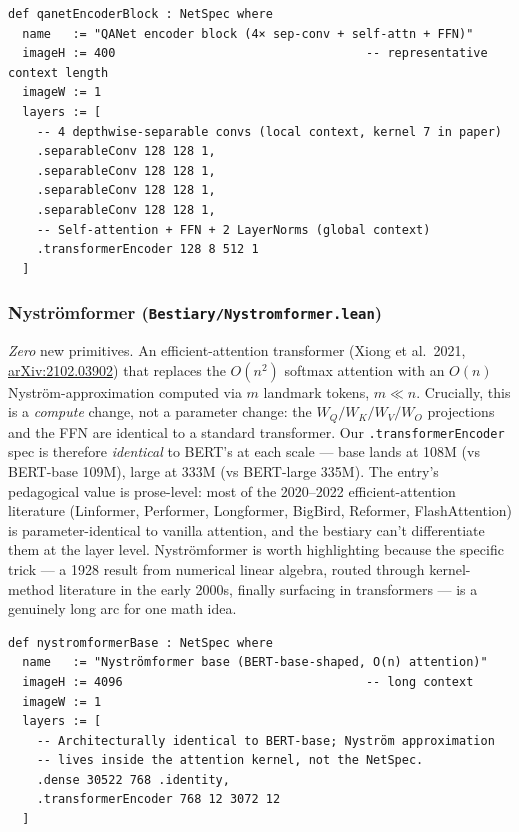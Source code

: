 \begin{verbatim}
def qanetEncoderBlock : NetSpec where
  name   := "QANet encoder block (4× sep-conv + self-attn + FFN)"
  imageH := 400                                   -- representative context length
  imageW := 1
  layers := [
    -- 4 depthwise-separable convs (local context, kernel 7 in paper)
    .separableConv 128 128 1,
    .separableConv 128 128 1,
    .separableConv 128 128 1,
    .separableConv 128 128 1,
    -- Self-attention + FFN + 2 LayerNorms (global context)
    .transformerEncoder 128 8 512 1
  ]
\end{verbatim}

\subsubsection*{Nyströmformer (\texttt{Bestiary/Nystromformer.lean})}
\emph{Zero} new primitives. An efficient-attention transformer
(Xiong et al.\ 2021,
\href{https://arxiv.org/abs/2102.03902}{arXiv:2102.03902}) that
replaces the $O(n^2)$ softmax attention
with an $O(n)$ Nyström-approximation computed via $m$ landmark
tokens, $m \ll n$. Crucially, this is a \emph{compute} change, not
a parameter change: the $W_Q / W_K / W_V / W_O$ projections and the
FFN are identical to a standard transformer. Our
\texttt{.transformerEncoder} spec is therefore \emph{identical} to
BERT's at each scale --- base lands at 108M (vs BERT-base 109M),
large at 333M (vs BERT-large 335M). The entry's pedagogical value is
prose-level: most of the 2020--2022 efficient-attention literature
(Linformer, Performer, Longformer, BigBird, Reformer,
FlashAttention) is parameter-identical to vanilla attention, and the
bestiary can't differentiate them at the layer level. Nyströmformer
is worth highlighting because the specific trick --- a 1928 result
from numerical linear algebra, routed through kernel-method
literature in the early 2000s, finally surfacing in transformers ---
is a genuinely long arc for one math idea.

\begin{verbatim}
def nystromformerBase : NetSpec where
  name   := "Nyströmformer base (BERT-base-shaped, O(n) attention)"
  imageH := 4096                                  -- long context
  imageW := 1
  layers := [
    -- Architecturally identical to BERT-base; Nyström approximation
    -- lives inside the attention kernel, not the NetSpec.
    .dense 30522 768 .identity,
    .transformerEncoder 768 12 3072 12
  ]
\end{verbatim}


